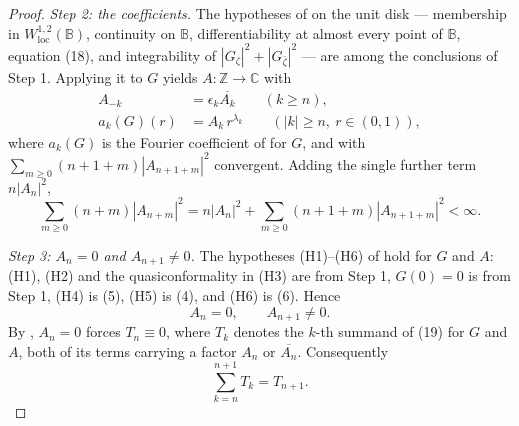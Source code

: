 \begin{proof}
\emph{Step 2: the coefficients.}  The hypotheses of
 on the unit disk --- membership in
$W^{1,2}_{\mathrm{loc}}(\mathbb{B})$, continuity on $\mathbb{B}$,
differentiability at almost every point of $\mathbb{B}$, equation (18), and
integrability of $|G_\zeta|^2+|G_{\bar\zeta}|^2$ --- are among the conclusions
of Step 1.
Applying it to $G$ yields $A\colon\mathbb{Z}\to\mathbb{C}$ with
\begin{align}
  A_{-k}&=\epsilon_k\overline{A_k}\qquad(k\ge n),\tag{4}\\
  a_k(G)(r)&=A_k\,r^{\lambda_k}\qquad(|k|\ge n,\ r\in(0,1)),\tag{5}
\end{align}
where $a_k(G)$ is the Fourier coefficient of  for $G$,
and with $\sum_{m\ge0}(n+1+m)|A_{n+1+m}|^2$ convergent.  Adding the single
further term $n|A_n|^2$,
\begin{equation}\tag{6}
  \sum_{m\ge0}(n+m)|A_{n+m}|^2
  =n|A_n|^2+\sum_{m\ge0}(n+1+m)|A_{n+1+m}|^2<\infty .
\end{equation}

\emph{Step 3: $A_n=0$ and $A_{n+1}\neq0$.}  The hypotheses (H1)--(H6) of
 hold for $G$ and $A$: (H1), (H2) and the
quasiconformality in (H3) are from Step 1, $G(0)=0$ is from Step 1, (H4) is
(5), (H5) is (4), and (H6) is (6).  Hence
\begin{equation}\tag{7}
  A_n=0,\qquad A_{n+1}\neq0 .
\end{equation}
By , $A_n=0$ forces $T_n\equiv0$, where $T_k$ denotes the
$k$-th summand of (19) for $G$ and $A$, both of its terms carrying a factor
$A_n$ or $\overline{A_n}$.  Consequently
\begin{equation}\tag{8}
  \sum_{k=n}^{n+1}T_k=T_{n+1}.
\end{equation}


\end{proof}
